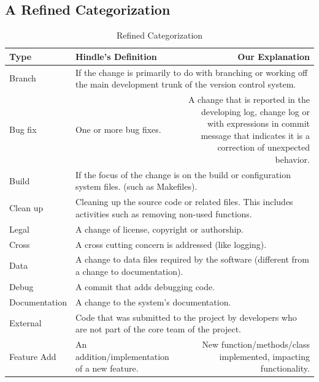 \subsection{A Refined Categorization}
\begin{table}[htbp]
  \centering
  \caption{Refined Categorization}
    \begin{tabular}{|p{6em}|p{9em}r|}
    \hline
    Type  & \multicolumn{1}{p{9em}|}{Hindle's Definition} & \multicolumn{1}{p{12.5em}|}{Our Explanation} \\
    \hline
    Branch & \multicolumn{2}{p{21.5em}|}{If the change is primarily to do with branching or working off the main development trunk of the version control system.} \\
    \hline
    Bug fix & \multicolumn{1}{p{9em}|}{One or more bug fixes.} & \multicolumn{1}{p{12.5em}|}{A change that is reported in the developing log, change log or with expressions in commit message that indicates it is a correction of unexpected behavior.} \\
    \hline
    Build & \multicolumn{2}{p{21.5em}|}{If the focus of the change is on the build or configuration system files. (such as Makefiles).} \\
    \hline
    Clean up & \multicolumn{2}{p{21.5em}|}{Cleaning up the source code or related files. This includes activities such as removing non-used functions.} \\
    \hline
    Legal & \multicolumn{2}{p{21.5em}|}{A change of license, copyright or authorship.} \\
    \hline
    Cross & \multicolumn{2}{p{21.5em}|}{A cross cutting concern is addressed (like logging).} \\
    \hline
    Data  & \multicolumn{2}{p{21.5em}|}{A change to data files required by the software (different from a change to documentation).} \\
    \hline
    Debug & \multicolumn{2}{p{21.5em}|}{A commit that adds debugging code.} \\
    \hline
    Documentation & \multicolumn{2}{p{21.5em}|}{A change to the system's documentation.} \\
    \hline
    External & \multicolumn{2}{p{21.5em}|}{Code that was submitted to the project by developers who are not part of the core team of the project.} \\
    \hline
    Feature Add & \multicolumn{1}{p{9em}|}{An addition/implementation of a new feature.} & \multicolumn{1}{p{12.5em}|}{New function/methods/class implemented, impacting functionality.} \\

\end{tabular}
\end{table}

